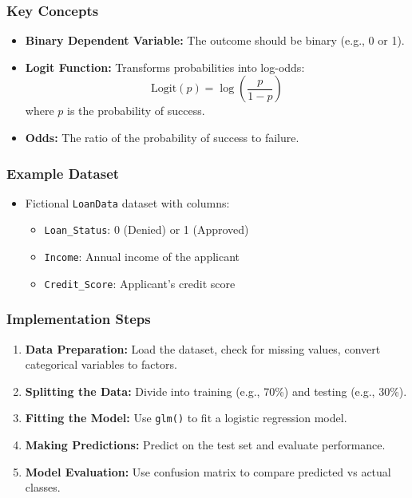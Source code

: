 \documentclass[aspectratio=169]{beamer}
\begin{document}
\begin{frame}[fragile]
    \frametitle{Key Concepts}
    \begin{itemize}
        \item \textbf{Binary Dependent Variable:} The outcome should be binary (e.g., 0 or 1).
        \item \textbf{Logit Function:} Transforms probabilities into log-odds:
        \begin{equation}
            \text{Logit}(p) = \log \left( \frac{p}{1 - p} \right)
        \end{equation}
        where \( p \) is the probability of success.
        \item \textbf{Odds:} The ratio of the probability of success to failure.
    \end{itemize}
\end{frame}

\begin{frame}[fragile]
    \frametitle{Example Dataset}
    \begin{itemize}
        \item Fictional \texttt{LoanData} dataset with columns:
        \begin{itemize}
            \item \texttt{Loan\_Status}: 0 (Denied) or 1 (Approved)
            \item \texttt{Income}: Annual income of the applicant
            \item \texttt{Credit\_Score}: Applicant's credit score
        \end{itemize}
    \end{itemize}
\end{frame}

\begin{frame}[fragile]
    \frametitle{Implementation Steps}
    \begin{enumerate}
        \item \textbf{Data Preparation:} Load the dataset, check for missing values, convert categorical variables to factors.
        \item \textbf{Splitting the Data:} Divide into training (e.g., 70\%) and testing (e.g., 30\%).
        \item \textbf{Fitting the Model:} Use \texttt{glm()} to fit a logistic regression model.
        \item \textbf{Making Predictions:} Predict on the test set and evaluate performance.
        \item \textbf{Model Evaluation:} Use confusion matrix to compare predicted vs actual classes.
    \end{enumerate}
\end{frame}
\end{document}

